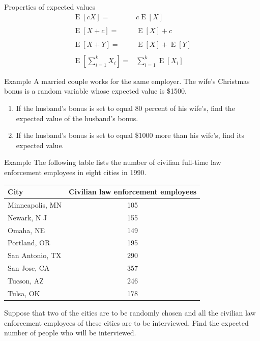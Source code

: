\documentclass{beamer}
\newcommand{\E}{\operatorname{E}}
\begin{document}
\begin{frame}{Properties of expected values}
  \begin{align*}
    \E[cX] =& c\E[X]\\
    \\
    \E[X+c] =& \E[X] + c\\
    \\
    \E[X + Y] =& \E[X] + \E[Y]\\
    \\
    \E\left[ \sum_{i=1}^k X_i\right] =& \sum_{i=1}^k \E[X_i]
  \end{align*}
\end{frame}

\begin{frame}[t]{Example}
  A married couple works for the same employer. The wife’s Christmas bonus is a
  random variable whose expected value is \$1500.
  \begin{enumerate}
  \item If the husband's bonus is set to equal 80 percent of his wife’s, find
    the expected value of the husband’s bonus.
  \item If the husband’s bonus is set to equal \$1000 more than his wife’s, find its
    expected value.
  \end{enumerate}
\end{frame}

\begin{frame}[t,shrink=10]{Example}
  The following table lists the number of civilian full-time law enforcement
  employees in eight cities in 1990.

  \begin{tabular*}{1.0\linewidth}{l c}
    City & Civilian law enforcement employees\\
    \hline
    Minneapolis, MN & 105\\
    Newark, N J & 155\\
    Omaha, NE & 149\\
    Portland, OR & 195\\
    San Antonio, TX & 290\\
    San Jose, CA & 357\\
    Tucson, AZ & 246\\
    Tulsa, OK & 178\\
  \end{tabular*}

  Suppose that two of the cities are to be randomly chosen and all the civilian
  law enforcement employees of these cities are to be interviewed. Find the
  expected number of people who will be interviewed.
\end{frame}
\end{document}
